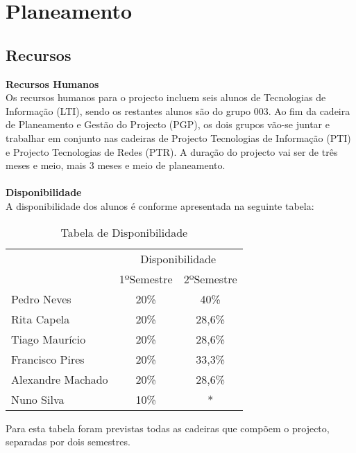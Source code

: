 \documentclass[12pt, a4paper, twoside]{report} %
\begin{document}
\chapter{Planeamento}

\section{Recursos}

\textbf{Recursos Humanos}
\\

Os recursos humanos para o projecto incluem seis alunos de Tecnologias de Informação (LTI), sendo os restantes alunos são do grupo 003.
Ao fim da cadeira de Planeamento e Gestão do Projecto (PGP), os dois grupos vão-se juntar e trabalhar em conjunto nas cadeiras de Projecto Tecnologias de Informação (PTI) e Projecto Tecnologias de Redes (PTR). A duração do projecto vai ser de três meses e meio, mais 3 meses e meio de planeamento. 
\\
\\
\textbf{Disponibilidade}
\\

A disponibilidade dos alunos é conforme apresentada na seguinte tabela:

\begin{table}[h]
\centering
\begin{tabular}{|l|c|c|}
\hline
\multirow{2}{*}{} & \multicolumn{2}{c|}{Disponibilidade} \\ \cline{2-3} 
                  & 1ºSemestre        & 2ºSemestre       \\ \hline
Pedro Neves       & 20\%              & 40\%             \\ \hline
Rita Capela       & 20\%              & 28,6\%           \\ \hline
Tiago Maurício    & 20\%              & 28,6\%           \\ \hline
Francisco Pires   & 20\%              & 33,3\%           \\ \hline
Alexandre Machado & 20\%              & 28,6\%           \\ \hline
Nuno Silva        & 10\%              & *                \\ \hline
\end{tabular}
\caption{Tabela de Disponibilidade}
\label{disponibilidade}
\end{table}

Para esta tabela foram previstas todas as cadeiras que compõem o projecto, separadas por dois semestres. 
\clearpage
\end{document}
